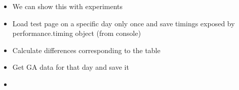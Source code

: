 \begin{itemize}
\item We can show this with experiments
\item Load test page on a specific day only once and save timings exposed by performance.timing object (from console)
\item Calculate differences corresponding to the table
\item Get GA data for that day and save it
\item 
\end{itemize}















